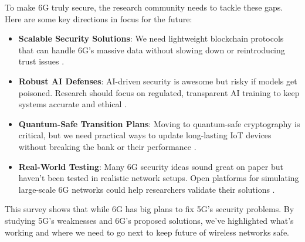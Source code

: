 \documentclass[acmtog]{acmart}
\begin{document}
To make 6G truly secure, the research community needs to tackle these gaps. Here are some key directions in focus for the future:
\begin{itemize}
  \item \textbf{Scalable Security Solutions}: We need lightweight blockchain protocols that can handle 6G’s massive data without slowing down or reintroducing trust issues \cite{ref2}.
  \item \textbf{Robust AI Defenses}: AI-driven security is awesome but risky if models get poisoned. Research should focus on regulated, transparent AI training to keep systems accurate and ethical \cite{ref5}.
  \item \textbf{Quantum-Safe Transition Plans}: Moving to quantum-safe cryptography is critical, but we need practical ways to update long-lasting IoT devices without breaking the bank or their performance \cite{ref8}.
  \item \textbf{Real-World Testing}: Many 6G security ideas sound great on paper but haven’t been tested in realistic network setups. Open platforms for simulating large-scale 6G networks could help researchers validate their solutions \cite{ref4}.
\end{itemize}
This survey shows that while 6G has big plans to fix 5G’s security problems. By studying 5G’s weaknesses and 6G’s proposed solutions, we’ve highlighted what’s working and where we need to go next to keep future of wireless networks safe.



\end{document}
